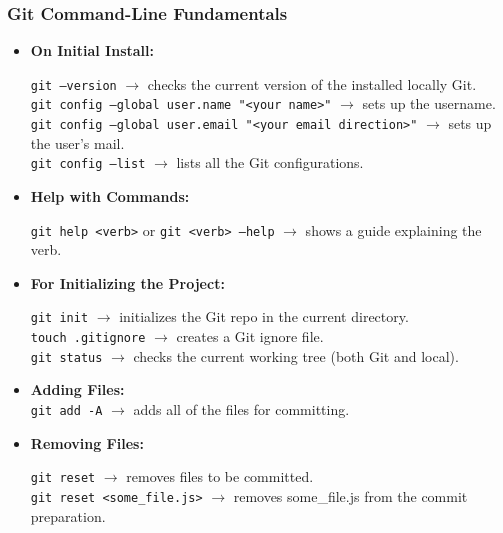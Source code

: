 \documentclass{article}
\begin{document}
    \subsubsection{Git Command-Line Fundamentals}
    
    \begin{itemize}
    	\item \textbf{On Initial Install:}\\
    	    \begin{doublespace}
    	      {\tt git --version} $\rightarrow$ checks the current version of the installed locally Git.\\
    	      {\tt git config --global user.name "<your name>"} $\rightarrow$ sets up the username.\\
    	      {\tt git config --global user.email "<your email direction>"} $\rightarrow$ sets up the user's mail.\\
    	      {\tt git config --list} $\rightarrow$ lists all the Git configurations.
    	    \end{doublespace}
        
    	\item \textbf{Help with Commands:}\\
    	    \begin{doublespace}
    	    	{\tt git help <verb>} or {\tt git <verb> --help} $\rightarrow$ shows a guide explaining the verb.
    	    \end{doublespace}
        
        \item \textbf{For Initializing the Project:}\\
            \begin{doublespace}
        	    {\tt git init} $\rightarrow$ initializes the Git repo in the current directory.\\
        	    {\tt touch .gitignore} $\rightarrow$ creates a Git ignore file.\\
        	    {\tt git status} $\rightarrow$ checks the current working tree (both Git and local).
            \end{doublespace}
        
        \item \textbf{Adding Files:}\\
        	{\tt git add -A} $\rightarrow$ adds all of the files for committing.
        	
        \item \textbf{Removing Files:}\\
            \begin{doublespace}
        	    {\tt git reset} $\rightarrow$ removes files to be committed.\\
        	    {\tt git reset <some\_file.js>} $\rightarrow$ removes some\_file.js from the commit preparation.
            \end{doublespace}
    	

\end{itemize}
\end{document}
